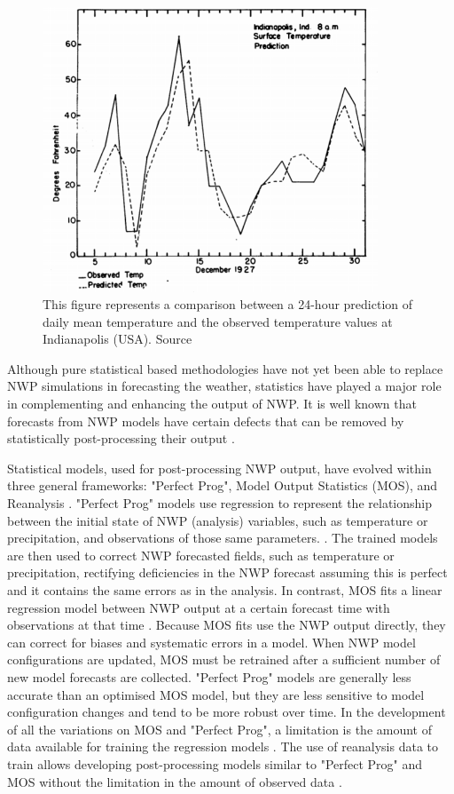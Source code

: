\medskip

\begin{figure}[h]
 \centerline{\includegraphics[width=10cm]{regression_meteo.png}} \caption{This figure represents a comparison between a 24-hour prediction of daily mean temperature and the observed temperature values at Indianapolis (USA). Source \citep{malone1955application}}\label{regression_meteo}
\end{figure}

Although pure statistical based methodologies have not yet been able to replace NWP simulations in forecasting the weather, statistics have played a major role in complementing and enhancing the output of NWP. It is well known that forecasts from NWP models have certain defects that can be removed by statistically post-processing their output \citep{wilks1995forecast}. 

\medskip

Statistical models, used for post-processing NWP output, have evolved within three general frameworks: "Perfect Prog", Model Output Statistics (MOS), and Reanalysis \citep{marzban2006mos}. "Perfect Prog" models use regression to represent the relationship between the initial state of NWP (analysis) variables, such as temperature or precipitation, and observations of those same parameters. \citep{klein1959objective}. The trained models are then used to correct NWP forecasted fields, such as temperature or precipitation, rectifying deficiencies in the NWP forecast assuming this is perfect and it contains the same errors as in the analysis. In contrast, MOS fits a linear regression model between NWP output at a certain forecast time with observations at that time \citep{glahn1972use}. Because MOS fits use the NWP output directly, they can correct for biases and systematic errors in a model. When NWP model configurations are updated, MOS must be retrained after a sufficient number of new model forecasts are collected. "Perfect Prog" models are generally less accurate than an optimised MOS model, but they are less sensitive to model configuration changes and tend to be more robust over time. In the development of all the variations on MOS and "Perfect Prog", a limitation is the amount of data available for training the regression models \citep{mcgovern2017using}. The use of reanalysis data to train allows developing post-processing models similar to "Perfect Prog" and MOS without the limitation in the amount of observed data \citep{kalnay2003atmospheric}.

